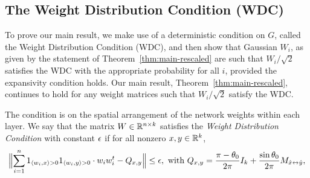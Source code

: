 
\subsection{\label{sec:WDC}
The Weight Distribution Condition (WDC)}

To prove our main result, we make use of a deterministic condition on $G$, called the Weight Distribution Condition (WDC), and then show that Gaussian $W_i$, as given by the statement of Theorem~\ref{thm:main-rescaled} are such that $W_i / \sqrt{2}$ satisfies the WDC with the appropriate probability for all $i$, provided the expansivity condition holds.
Our main result, Theorem~\ref{thm:main-rescaled}, continues to hold for any weight matrices such that $W_i/\sqrt{2}$ satisfy the WDC.

The condition is on the spatial arrangement of the network weights within each layer.
We say that the matrix $W \in \mathbb{R}^{n \times k}$ satisfies the \textit{Weight Distribution Condition} with constant $\epsilon$ if for all nonzero $x,y \in \mathbb{R}^k$,
\begin{align}
\Bigl \| \sum_{i=1}^n 1_{\innerprod{w_i}{x}>0} 1_{\innerprod{w_i}{y}>0} \cdot w_i w_i^t  - \Qxy \Bigr \| \leq \eps,  \text{ with } \Qxy = \frac{\pi - \theta_0}{2 \pi} I_k + \frac{\sin \theta_0}{2\pi}  \Mxyhat, \label{WDC}
\end{align}
